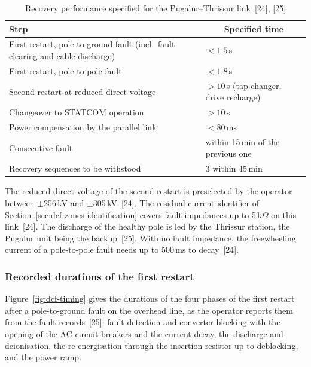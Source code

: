 \begin{table}[!ht]
  \centering
  \begin{tabularx}{\linewidth}{@{}>{\raggedright\arraybackslash}X l@{}}
    \toprule
    \textbf{Step} & \multicolumn{1}{c}{\textbf{Specified time}} \\
    \midrule
    First restart, pole-to-ground fault (incl.\ fault clearing and
      cable discharge) & $< 1.5$\,s \\
    First restart, pole-to-pole fault & $< 1.8$\,s \\
    Second restart at reduced direct voltage & $> 10$\,s (tap-changer, drive recharge) \\
    Changeover to STATCOM operation & $> 10$\,s \\
    Power compensation by the parallel link & $< 80$\,ms \\
    Consecutive fault & within 15\,min of the previous one \\
    Recovery sequences to be withstood & 3 within 45\,min \\
    \bottomrule
  \end{tabularx}
  \caption{Recovery performance specified for the Pugalur--Thrissur
           link~[24], [25]}
  \label{tab:dcf-spec}
\end{table}

The reduced direct voltage of the second restart is preselected by the
operator between $\pm$256\,kV and $\pm$305\,kV~[24]. The residual-current
identifier of Section~\ref{sec:dcf-zones-identification} covers fault
impedances up to 5\,k$\Omega$ on this link~[24]. The discharge of the
healthy pole is led by the Thrissur station, the Pugalur unit being the
backup~[25]. With no fault impedance, the freewheeling current of a
pole-to-pole fault needs up to 500\,ms to decay~[24].

\subsubsection{Recorded durations of the first restart}
\label{sec:dcf-pugalur-timing}

Figure~\ref{fig:dcf-timing} gives the durations of the four phases of the
first restart after a pole-to-ground fault on the overhead line, as the
operator reports them from the fault records~[25]: fault detection and
converter blocking with the opening of the AC circuit breakers and the
current decay, the discharge and deionisation, the re-energisation through
the insertion resistor up to deblocking, and the power ramp.

